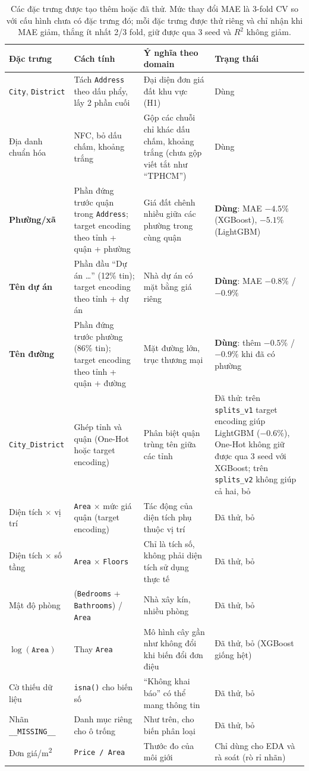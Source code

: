 \documentclass[11pt]{article}
\begin{document}
\begin{table}[H]
\centering
\small
\caption{Các đặc trưng được tạo thêm hoặc đã thử. Mức thay đổi MAE là 3-fold CV so với cấu hình chưa có
đặc trưng đó; mỗi đặc trưng được thử riêng và chỉ nhận khi MAE giảm, thắng ít nhất 2/3 fold, giữ được qua 3 seed và $R^2$ không giảm.}
\begin{tabular}{@{}L{0.17\textwidth}L{0.23\textwidth}L{0.28\textwidth}L{0.22\textwidth}@{}}
\toprule
\textbf{Đặc trưng} & \textbf{Cách tính} & \textbf{Ý nghĩa theo domain} & \textbf{Trạng thái} \\
\midrule
\texttt{City}, \texttt{District} & Tách \texttt{Address} theo dấu phẩy, lấy 2 phần cuối & Đại diện đơn giá đất khu vực (H1) & Dùng \\
Địa danh chuẩn hóa & NFC, bỏ dấu chấm, khoảng trắng & Gộp các chuỗi chỉ khác dấu chấm, khoảng trắng (chưa gộp viết tắt như ``TPHCM'') & Dùng \\
\textbf{Phường/xã} & Phần đứng trước quận trong \texttt{Address}; target encoding theo tỉnh + quận + phường & Giá đất chênh nhiều giữa các phường trong cùng quận & \textbf{Dùng}: MAE $-4.5\%$ (XGBoost), $-5.1\%$ (LightGBM) \\
\textbf{Tên dự án} & Phần đầu ``Dự án \ldots'' (12\% tin); target encoding theo tỉnh + dự án & Nhà dự án có mặt bằng giá riêng & \textbf{Dùng}: MAE $-0.8\%$ / $-0.9\%$ \\
\textbf{Tên đường} & Phần đứng trước phường (86\% tin); target encoding theo tỉnh + quận + đường & Mặt đường lớn, trục thương mại & \textbf{Dùng}: thêm $-0.5\%$ / $-0.9\%$ khi đã có phường \\
\texttt{City\_District} & Ghép tỉnh và quận (One-Hot hoặc target encoding) & Phân biệt quận trùng tên giữa các tỉnh & Đã thử: trên \texttt{splits\_v1} target encoding giúp LightGBM ($-0.6\%$), One-Hot không giữ được qua 3 seed với XGBoost; trên \texttt{splits\_v2} không giúp cả hai, bỏ \\
Diện tích $\times$ vị trí & \texttt{Area} $\times$ mức giá quận (target encoding) & Tác động của diện tích phụ thuộc vị trí & Đã thử, bỏ \\
Diện tích $\times$ số tầng & \texttt{Area} $\times$ \texttt{Floors} & Chỉ là tích số, không phải diện tích sử dụng thực tế & Đã thử, bỏ \\
Mật độ phòng & (\texttt{Bedrooms} + \texttt{Bathrooms}) / \texttt{Area} & Nhà xây kín, nhiều phòng & Đã thử, bỏ \\
$\log(\texttt{Area})$ & Thay \texttt{Area} & Mô hình cây gần như không đổi khi biến đổi đơn điệu & Đã thử, bỏ (XGBoost giống hệt) \\
Cờ thiếu dữ liệu & \texttt{isna()} cho biến số & ``Không khai báo'' có thể mang thông tin & Đã thử, bỏ \\
Nhãn \texttt{\_\_MISSING\_\_} & Danh mục riêng cho ô trống & Như trên, cho biến phân loại & Đã thử, bỏ \\
Đơn giá/m\textsuperscript{2} & \texttt{Price / Area} & Thước đo của môi giới & Chỉ dùng cho EDA và rà soát (rò rỉ nhãn) \\
\bottomrule
\end{tabular}
\end{table}
\end{document}
